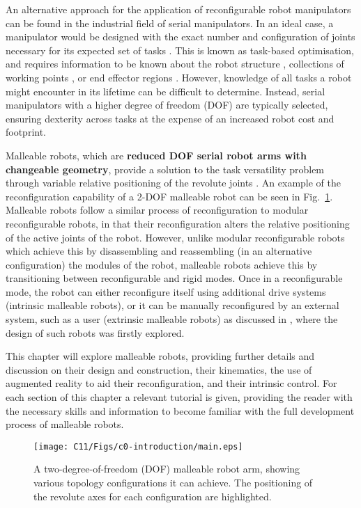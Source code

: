 An alternative approach for the application of reconfigurable robot manipulators can be found in the industrial field of serial manipulators. In an ideal case, a manipulator would be designed with the exact number and configuration of joints necessary for its expected set of tasks \cite{kereluk2017task}. This is known as task-based optimisation, and requires information to be known about the robot structure \cite{brandstotter2018task}, collections of working points \cite{yang2000task}, or end effector regions \cite{kereluk2017task}. However, knowledge of all tasks a robot might encounter in its lifetime can be difficult to determine. Instead, serial manipulators with a higher degree of freedom (DOF) are typically selected, ensuring dexterity across tasks at the expense of an increased robot cost and footprint.

Malleable robots, which are \textbf{reduced DOF serial robot arms with changeable geometry}, provide a solution to the task versatility problem through variable relative positioning of the revolute joints \cite{clark2020design}. An example of the reconfiguration capability of a 2-DOF malleable robot can be seen in Fig.~\ref{malleablerobotdiagram}. Malleable robots follow a similar process of reconfiguration to modular reconfigurable robots, in that their reconfiguration alters the relative positioning of the active joints of the robot. However, unlike modular reconfigurable robots which achieve this by disassembling and reassembling (in an alternative configuration) the modules of the robot, malleable robots achieve this by transitioning between reconfigurable and rigid modes. Once in a reconfigurable mode, the robot can either reconfigure itself using additional drive systems (intrinsic malleable robots), or it can be manually reconfigured by an external system, such as a user (extrinsic malleable robots) as discussed in \cite{clark2020design}, where the design of such robots was firstly explored.

This chapter will explore malleable robots, providing further details and discussion on their design and construction, their kinematics, the use of augmented reality to aid their reconfiguration, and their intrinsic control. For each section of this chapter a relevant tutorial is given, providing the reader with the necessary skills and information to become familiar with the full development process of malleable robots.

\begin{figure}[t!]
    \centering
    \texttt{[image: C11/Figs/c0-introduction/main.eps]}
    \caption{A two-degree-of-freedom (DOF) malleable robot arm, showing various topology configurations it can achieve. The positioning of the revolute axes for each configuration are highlighted.}
    \label{malleablerobotdiagram}
\end{figure}


